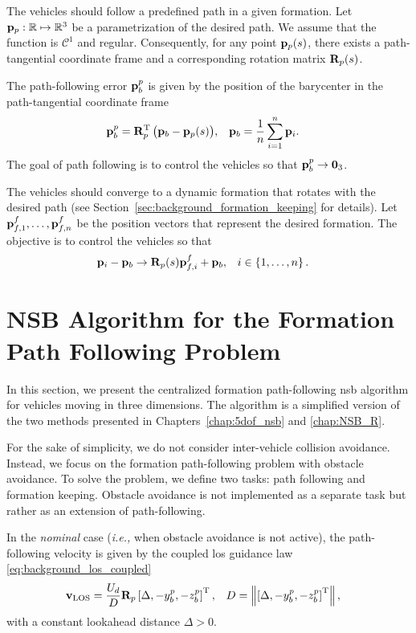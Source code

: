 The vehicles should follow a predefined path in a given formation.
Let $\mathbf{p}_p: \mathbb{R} \mapsto \mathbb{R}^3$ be a parametrization of the desired path.
We assume that the function is $\mathcal{C}^1$ and regular.
Consequently, for any point $\mathbf{p}_p(s)$, there exists a path-tangential coordinate frame and a corresponding rotation matrix $\mathbf{R}_p(s)$.

The path-following error $\mathbf{p}_b^p$ is given by the position of the barycenter in the path-tangential coordinate frame 
\begin{align}
    \mathbf{p}_b^p &= \mathbf{R}_p^{\mathrm{T}} \, \big(\mathbf{p}_b - \mathbf{p}_p(s)\big), &
    \mathbf{p}_b &= \frac{1}{n} \sum_{i=1}^n \mathbf{p}_i.
    \label{eq:distr_NSB_barycenter}
\end{align}
The goal of path following is to control the vehicles so that $\mathbf{p}_b^p \rightarrow \mathbf{0}_3$.

The vehicles should converge to a dynamic formation that rotates with the desired path (see Section~\ref{sec:background_formation_keeping} for details).
Let $\mathbf{p}_{f,1}^f, \ldots, \mathbf{p}_{f,n}^f$ be the position vectors that represent the desired formation.
The objective is to control the vehicles so that
\begin{align}
    \mathbf{p}_i - \mathbf{p}_b &\rightarrow \mathbf{R}_p(s) \mathbf{p}_{f,i}^f + \mathbf{p}_b, &
    i &\in \left\{1, \ldots, n \right\}.
\end{align}

\section{NSB Algorithm for the Formation Path Following Problem}
\label{sec:distr_NSB_NSB}
In this section, we present the centralized formation path-following \gls{nsb} algorithm for vehicles moving in three dimensions.
The algorithm is a simplified version of the two methods presented in Chapters~\ref{chap:5dof_nsb} and \ref{chap:NSB_R}.

For the sake of simplicity, we do not consider inter-vehicle collision avoidance.
Instead, we focus on the formation path-following problem with obstacle avoidance.
To solve the problem, we define two tasks: path following and formation keeping.
Obstacle avoidance is not implemented as a separate task but rather as an extension of path-following.

In the \emph{nominal} case (\emph{i.e.,} when obstacle avoidance is not active), the path-following velocity is given by the coupled \acrfull{los} guidance law \eqref{eq:background_los_coupled}
\begin{align}
    \mathbf{v}_{\rm LOS} &= \frac{U_d}{D} \mathbf{R}_p \left[\Delta, -y_b^p, -z_b^p\right]^{\mathrm{T}}, &
    D &= \left\|\left[\Delta, -y_b^p, -z_b^p\right]^{\mathrm{T}}\right\|,
    \label{eq:distr_NSB_v_LOS_centralized}
\end{align}
with a constant lookahead distance $\Delta > 0$.

